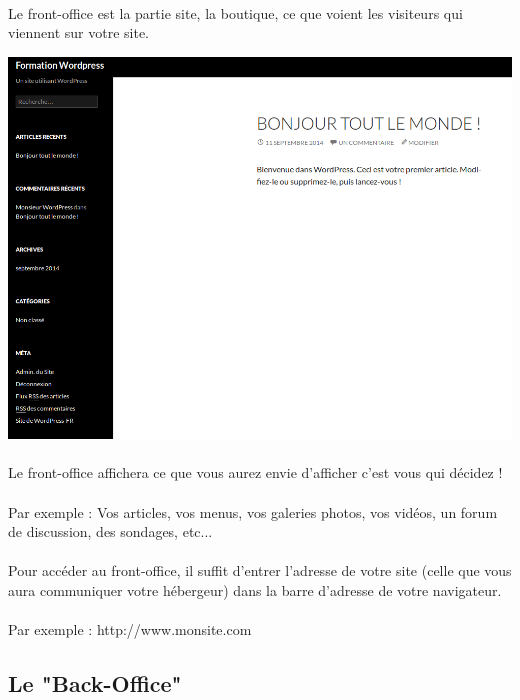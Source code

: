 \documentclass[10pt,a4paper]{article}
\begin{document}
\paragraph{}Le front-office est la partie site, la boutique, ce que voient les visiteurs qui viennent sur votre site.
\begin{center}
\includegraphics[scale=0.35]{img/0047.png}
\end{center}
\paragraph{}Le front-office affichera ce que vous aurez envie d'afficher c'est vous qui décidez !
\paragraph{}Par exemple : Vos articles, vos menus, vos galeries photos, vos vidéos, un forum de discussion, des sondages, etc...
\paragraph{}Pour accéder au front-office, il suffit d'entrer l'adresse de votre site (celle que vous aura communiquer votre hébergeur) dans la barre d'adresse de votre navigateur.
\paragraph{}Par exemple : http://www.monsite.com

\subsection{Le "Back-Office"}
\end{document}
